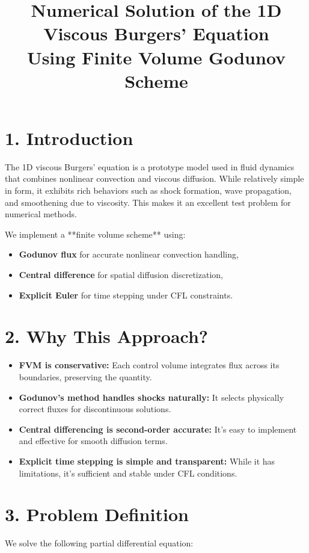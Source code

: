 \documentclass[12pt]{article}
\title{\textbf{Numerical Solution of the 1D Viscous Burgers' Equation\\ Using Finite Volume Godunov Scheme}}
\author{}
\date{}
\begin{document}
\maketitle

\section*{1. Introduction}
The 1D viscous Burgers’ equation is a prototype model used in fluid dynamics that combines nonlinear convection and viscous diffusion. While relatively simple in form, it exhibits rich behaviors such as shock formation, wave propagation, and smoothening due to viscosity. This makes it an excellent test problem for numerical methods.

We implement a **finite volume scheme** using:
\begin{itemize}
    \item \textbf{Godunov flux} for accurate nonlinear convection handling,
    \item \textbf{Central difference} for spatial diffusion discretization,
    \item \textbf{Explicit Euler} for time stepping under CFL constraints.
\end{itemize}

\section*{2. Why This Approach?}
\begin{itemize}
    \item \textbf{FVM is conservative:} Each control volume integrates flux across its boundaries, preserving the quantity.
    \item \textbf{Godunov's method handles shocks naturally:} It selects physically correct fluxes for discontinuous solutions.
    \item \textbf{Central differencing is second-order accurate:} It’s easy to implement and effective for smooth diffusion terms.
    \item \textbf{Explicit time stepping is simple and transparent:} While it has limitations, it’s sufficient and stable under CFL conditions.
\end{itemize}

\section*{3. Problem Definition}
We solve the following partial differential equation:
\end{document}
